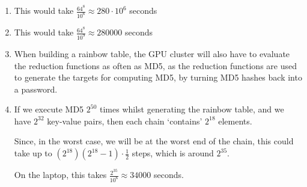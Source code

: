 \begin{enumerate}[label=(\alph*)]
\begin{enumerate}[label=(\roman*)]
      \item
        This would take $\frac{64^8}{10^6} \approx 280 \cdot 10^6$ seconds

      \item
        This would take $\frac{64^8}{10^9} \approx 280000$ seconds

      \item
        When building a rainbow table, the GPU cluster will also have to evaluate the reduction functions as often as MD5, as the reduction functions are used to generate the targets for computing MD5, by turning MD5 hashes back into a password.

      \item
        If we execute MD5 $2^{50}$ times whilst generating the rainbow table, and we have $2^{32}$ key-value pairs, then each chain `contains' $2^{18}$ elements.

        Since, in the worst case, we will be at the worst end of the chain, this could take up to $(2^{18})(2^{18} - 1) \cdot \frac{1}{2}$ steps, which is around $2^{35}$.

        On the laptop, this takes $\frac{2^{35}}{10^6} \approx 34000$ seconds.
        
    \end{enumerate}
        
\end{enumerate}

